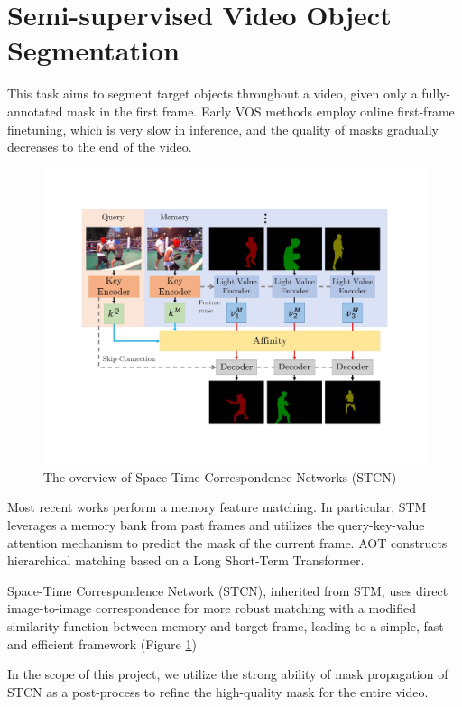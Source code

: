 

\section{Semi-supervised Video Object Segmentation}

This task aims to segment target objects throughout a video, given only a fully-annotated mask in the first frame. Early VOS methods \cite{voigtlaender_online_2017, caelles_one-shot_2017, maninis_video_2019} employ online first-frame finetuning, which is very slow in inference, and the quality of masks gradually decreases to the end of the video. 


\begin{figure}[b!]
    \centering
    \includegraphics[width=\textwidth]{content/resources/images/STCN.pdf}
    \caption{The overview of Space-Time Correspondence Networks (STCN)\cite{cheng_rethinking_2021} }
    \label{fig:stcn}
\end{figure}

Most recent works \cite{oh_video_2019, cheng_rethinking_2021, yang_associating_2021} perform a memory feature matching. In particular, STM\cite{oh_video_2019} leverages a memory bank from past frames and utilizes the query-key-value attention mechanism to predict the mask of the current frame. AOT\cite{yang_associating_2021} constructs hierarchical matching based on a Long Short-Term Transformer.

Space-Time Correspondence Network (STCN)\cite{cheng_rethinking_2021}, inherited from STM, uses direct image-to-image correspondence for more robust matching with a modified similarity function between memory and target frame, leading to a simple, fast and efficient framework (Figure \ref{fig:stcn})


In the scope of this project, we utilize the strong ability of mask propagation of STCN as a post-process to refine the high-quality mask for the entire video. 
